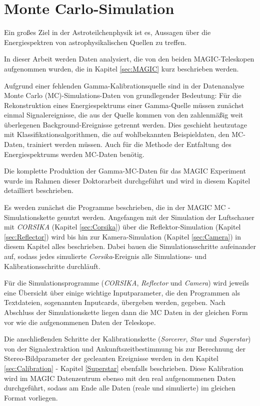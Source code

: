 \chapter{Monte Carlo-Simulation}
Ein großes Ziel in der Astroteilchenphysik ist es, Aussagen über die Energiespektren von astrophysikalischen Quellen zu treffen.

In dieser Arbeit werden Daten analysiert, die von den beiden MAGIC-Teleskopen aufgenommen wurden, die in Kapitel \ref{sec:MAGIC} kurz beschrieben werden.

Aufgrund einer fehlenden Gamma-Kalibrationsquelle sind in der Datenanalyse Monte Carlo (MC)-Simulations-Daten von grundlegender Bedeutung:
Für die Rekonstruktion eines Energiespektrums einer Gamma-Quelle müssen zunächst einmal Signalereignisse, die aus der Quelle kommen von den zahlenmäßig weit überlegenen Background-Ereignisse getrennt werden.
Dies geschieht heutzutage mit Klassifikationsalgorithmen, die auf wohlbekannten Beispieldaten, den MC-Daten, trainiert werden müssen.
Auch für die Methode der Entfaltung des Energiespektrums werden MC-Daten benötig.

Die komplette Produktion der Gamma-MC-Daten für das MAGIC Experiment wurde im Rahmen dieser Doktorarbeit durchgeführt und wird in diesem Kapitel detailliert beschrieben.

Es werden zunächst die Programme beschrieben, die in der MAGIC MC - Simulationskette genutzt werden.
Angefangen mit der Simulation der Luftschauer mit \textit{CORSIKA} (Kapitel \ref{sec:Corsika}) über die Reflektor-Simulation (Kapitel \ref{sec:Reflector}) wird bis hin zur Kamera-Simulation (Kapitel \ref{sec:Camera}) in diesem Kapitel alles beschrieben.
Dabei bauen die Simulationsschritte aufeinander auf, sodass jedes simulierte \textit{Corsika}-Ereignis alle Simulations- und Kalibrationsschritte durchläuft.

Für die Simulationsprogramme (\textit{CORSIKA}, \textit{Reflector} und \textit{Camera}) wird jeweils eine Übersicht über einige wichtige Inputparameter, die den Programmen als Textdateien,
sogenannten Inputcards, übergeben werden, gegeben.
Nach Abschluss der Simulationskette liegen dann die MC Daten in der gleichen Form vor wie die aufgenommenen Daten der Teleskope. 

Die anschließenden Schritte der Kalibrationskette (\textit{Sorcerer}, \textit{Star} und \textit{Superstar}) von der Signalextraktion und Ankunftszeitbestimmung bis zur Berechnung der Stereo-Bildparameter der gecleanten Ereignisse werden in den Kapitel \ref{sec:Calibration} - Kapitel \ref{Superstar} ebenfalls beschrieben.
Diese Kalibration wird im MAGIC Datenzentrum ebenso mit den real aufgenommenen Daten durchgeführt, sodass am Ende alle Daten (reale und simulierte) im gleichen Format vorliegen.

